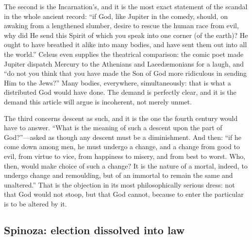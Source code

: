 The second is the Incarnation's, and it is the most exact statement of the scandal in the whole ancient record: ``if God, like Jupiter in the comedy, should, on awaking from a lengthened slumber, desire to rescue the human race from evil, why did He send this Spirit of which you speak into one corner (of the earth)? He ought to have breathed it alike into many bodies, and have sent them out into all the world.'' Celsus even supplies the theatrical comparison: the comic poet made Jupiter dispatch Mercury to the Athenians and Laced\ae monians for a laugh, and ``do not you think that you have made the Son of God more ridiculous in sending Him to the Jews?'' Many bodies, everywhere, simultaneously: that is what a distributed God would have done. The demand is perfectly clear, and it is the demand this article will argue is incoherent, not merely unmet.

The third concerns descent as such, and it is the one the fourth century would have to answer. ``What is the meaning of such a descent upon the part of God?''---asked as though any descent must be a diminishment. And then: ``if he come down among men, he must undergo a change, and a change from good to evil, from virtue to vice, from happiness to misery, and from best to worst. Who, then, would make choice of such a change? It is the nature of a mortal, indeed, to undergo change and remoulding, but of an immortal to remain the same and unaltered.'' That is the objection in its most philosophically serious dress: not that God would not stoop, but that God cannot, because to enter the particular is to be altered by it.

\subsection{Spinoza: election dissolved into law}

